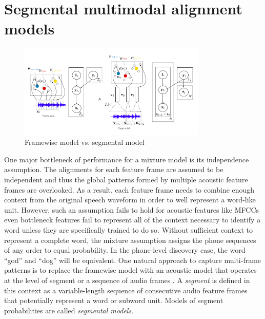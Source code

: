 \documentclass[journal]{IEEEtran}
\begin{document}
\section{Segmental multimodal alignment models}
\begin{figure}[t]
    \centering
    \includegraphics[width=0.8\textwidth]{fig_2.png}
    \caption{Framewise model vs. segmental model}
    \label{fig:frame-segmental-comparison}
\end{figure}
One major bottleneck of performance for a mixture model is its independence assumption. The alignments for each feature frame are assumed to be independent and thus the global patterns formed by multiple acoustic feature frames are overlooked. As a result, each feature frame needs to combine enough context from the original speech waveform in order to well represent a word-like unit. However, such an assumption fails to hold for acoustic features like MFCCs even bottleneck features fail to represent all of the context necessary to identify a word unless they are specifically trained to do so. Without sufficient context to represent a complete word, the mixture assumption assigns the phone sequences of any order to equal probability. In the phone-level discovery case, the word ``god'' and ``dog'' will be equivalent. One natural approach to capture multi-frame patterns is to replace the framewise model with an acoustic model that operates at the level of segment or a sequence of audio frames \cite{Kamper2017}. A \textit{segment} is defined in this context as a variable-length sequence of consecutive audio feature frames that potentially represent a word or subword unit. Models of segment probabilities are called  \textit{segmental models}.   
\end{document}
